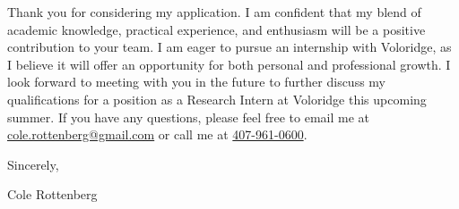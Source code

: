 \documentclass{ExpressiveCoverLetter}
\begin{document}
Thank you for considering my application. I am confident that my blend
of academic knowledge, practical experience, and enthusiasm will be a
positive contribution to your team. I am eager to pursue an internship
with Voloridge, as I believe it will offer an opportunity for both
personal and professional growth. I look forward to meeting with you in
the future to further discuss my qualifications for a position as a
Research Intern at Voloridge this upcoming summer. If you have any
questions, please feel free to email me at
\href{mailto:cole.rottenberg@gmail.com}{cole.rottenberg@gmail.com} or
call me at \href{tel:+1-407-961-0600}{407-961-0600}.

Sincerely,
\vspace{-15pt}

Cole Rottenberg
\end{document}
